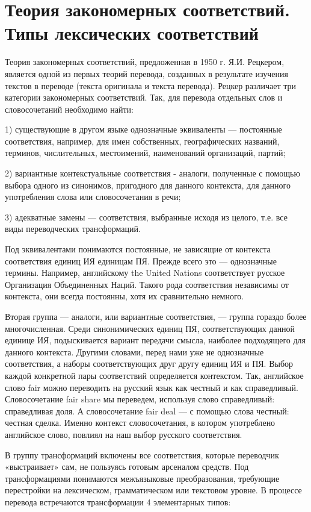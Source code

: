 \section{Теория закономерных соответствий. Типы лексических соответствий}

Теория закономерных соответствий, предложенная в 1950 г. Я.И. Рецкером, является одной из первых теорий перевода, созданных в результате изучения текстов в переводе (текста оригинала и текста перевода). Рецкер различает три категории закономерных соответствий. Так, для перевода отдельных слов и словосочетаний необходимо найти:

1) существующие в другом языке однозначные эквиваленты --- постоянные соответствия, например, для имен собственных, географических названий, терминов, числительных, местоимений, наименований организаций, партий;

2) вариантные контекстуальные соответствия - аналоги, полученные с помощью выбора одного из синонимов, пригодного для данного контекста, для данного употребления слова или словосочетания в речи;

3) адекватные замены --- соответствия, выбранные исходя из целого, т.е. все виды переводческих трансформаций.

Под эквивалентами понимаются постоянные, не зависящие от контекста соответствия единиц ИЯ единицам ПЯ. Прежде всего это --- однозначные термины. Например, английскому the United Nations соответствует русское Организация Объединенных Наций. Такого рода соответствия независимы от контекста, они всегда постоянны, хотя их сравнительно немного.

Вторая группа --- аналоги, или вариантные соответствия, --- группа гораздо более многочисленная. Среди синонимических единиц ПЯ, соответствующих данной единице ИЯ, подыскивается вариант передачи смысла, наиболее подходящего для данного контекста. Другими словами, перед нами уже не однозначные соответствия, а наборы соответствующих друг другу единиц ИЯ и ПЯ. Выбор каждой конкретной пары соответствий определяется контекстом. Так, английское слово fair можно переводить на русский язык как честный и как справедливый. Словосочетание fair share мы переведем, используя слово справедливый: справедливая доля. А словосочетание fair deal --- с помощью слова честный: честная сделка. Именно контекст словосочетания, в котором употреблено английское слово, повлиял на наш выбор русского соответствия.

В группу трансформаций включены все соответствия, которые переводчик «выстраивает» сам, не пользуясь готовым арсеналом средств. Под трансформациями понимаются межъязыковые преобразования, требующие перестройки на лексическом, грамматическом или текстовом уровне. В процессе перевода встречаются трансформации 4 элементарных типов:


